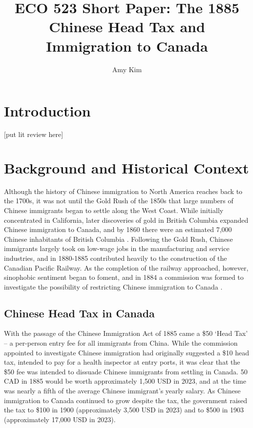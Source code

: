 \documentclass[12pt]{article}
\title{ECO 523 Short Paper: The 1885 Chinese Head Tax and Immigration to Canada}
\author{Amy Kim}
\begin{document}
\maketitle

\section{Introduction}

[put lit review here]

\section{Background and Historical Context}
Although the history of Chinese immigration to North America reaches back to the 1700s, it was not until the Gold Rush of the 1850s that large numbers of Chinese immigrants began to settle along the West Coast. 
While initially concentrated in California, later discoveries of gold in British Columbia expanded Chinese immigration to Canada, and by 1860 there were an estimated 7,000 Chinese inhabitants of British Columbia \citep{chan2019}.
Following the Gold Rush, Chinese immigrants largely took on low-wage jobs in the manufacturing and service industries, and in 1880-1885 contributed heavily to the construction of the Canadian Pacific Railway.
As the completion of the railway approached, however, sinophobic sentiment began to foment, and in 1884 a commission was formed to investigate the possibility of restricting Chinese immigration to Canada \citep{chan2016}.

\subsection{Chinese Head Tax in Canada}
With the passage of the Chinese Immigration Act of 1885 came a \$50 `Head Tax' -- a per-person entry fee for all immigrants from China. While the commission appointed to investigate Chinese immigration had originally suggested a \$10 head tax, intended to pay for a health inspector at entry ports,
it was clear that the \$50 fee was intended to dissuade Chinese immigrants from settling in Canada. 50 CAD in 1885 would be worth approximately 1,500 USD in 2023, and at the time was nearly a fifth of the average Chinese immigrant's yearly salary.
As Chinese immigration to Canada continued to grow despite the tax, the government raised the tax to \$100 in 1900 (approximately 3,500 USD in 2023) and to \$500 in 1903 (approximately 17,000 USD in 2023). \\ 
\end{document}
